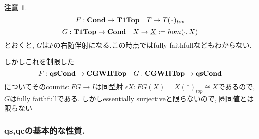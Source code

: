 \documentclass[dvipdfmx,a4paper,11pt]{article}
\theoremstyle{definition}
\newtheorem{rem}[thm]{注意}
\begin{document}
 \begin{rem}
 $$F: 
 {\bf Cond }\to 
 {\bf T1Top}
 \quad 
 T \to T(\ast)_{top}$$
$$G :  {\bf T1Top} \to {\bf Cond} \quad X \to \underline{X}:=hom(\cdot, X)$$
とおくと, $G$は$F$の右随伴射になる.この時点ではfully faithfullなどもわからない.

しかしこれを制限した
$$
F: {\bf qsCond}
\to {\bf CGWHTop} 
\quad G :  
{\bf CGWHTop} \to{\bf qsCond}
$$
についてそのcounit$\epsilon : FG \to I$は同型射
$\epsilon{X} : FG(X) = \underline{X}(\ast)_{top} \cong \underline{X}$であるので, $G$はfully faithfullである. しかしessentially surjectiveと限らないので, 圏同値とは限らない
 \end{rem}

 
 \subsubsection{qs,qcの基本的な性質.}
 
\end{document}
